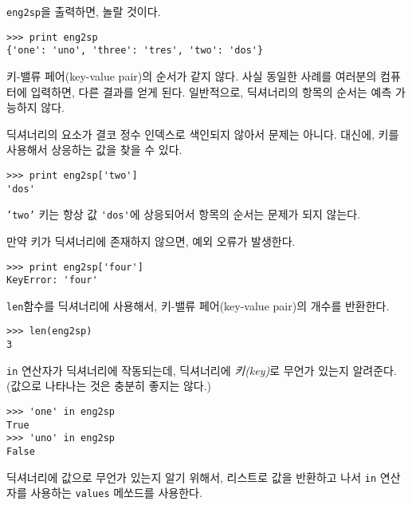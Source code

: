 {\tt eng2sp}을 출력하면, 놀랄 것이다.

\beforeverb
\begin{verbatim}
>>> print eng2sp
{'one': 'uno', 'three': 'tres', 'two': 'dos'}
\end{verbatim}
\afterverb
%

키-밸류 페어(key-value pair)의 순서가 같지 않다. 사실 동일한 사례를 여러분의 컴퓨터에 입력하면, 다른 결과를 얻게 된다.
일반적으로, 딕셔너리의 항목의 순서는 예측 가능하지 않다.

딕셔너리의 요소가 결코 정수 인덱스로 색인되지 않아서 문제는 아니다.
대신에, 키를 사용해서 상응하는 값을 찾을 수 있다.

\beforeverb
\begin{verbatim}
>>> print eng2sp['two']
'dos'
\end{verbatim}
\afterverb
%

{\tt 'two'} 키는 항상 값 \verb"'dos'"에 상응되어서 항목의 순서는 문제가 되지 않는다.

만약 키가 딕셔너리에 존재하지 않으면, 예외 오류가 발생한다.


\beforeverb
\begin{verbatim}
>>> print eng2sp['four']
KeyError: 'four'
\end{verbatim}
\afterverb
%

{\tt len}함수를 딕셔너리에 사용해서, 키-밸류 페어(key-value pair)의 개수를 반환한다.


\beforeverb
\begin{verbatim}
>>> len(eng2sp)
3
\end{verbatim}
\afterverb
%

{\tt in} 연산자가 딕셔너리에 작동되는데, 딕셔너리에 \emph{키(key)}로 무언가 있는지 알려준다. (값으로 나타나는 것은 충분히 좋지는 않다.)


\beforeverb
\begin{verbatim}
>>> 'one' in eng2sp
True
>>> 'uno' in eng2sp
False
\end{verbatim}
\afterverb
%

딕셔너리에 값으로 무언가 있는지 알기 위해서, 리스트로 값을 반환하고 나서 {\tt in} 연산자를 사용하는 {\tt values} 메쏘드를 사용한다. 


